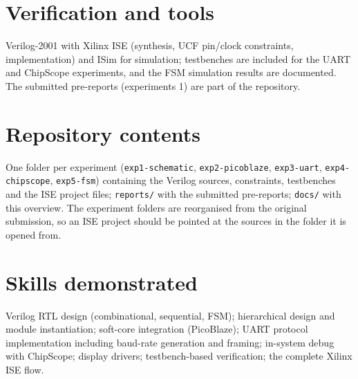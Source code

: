 \documentclass[10pt,a4paper]{article}
\begin{document}
\section*{Verification and tools}
Verilog-2001 with Xilinx ISE (synthesis, UCF pin/clock constraints, implementation) and ISim for simulation;
testbenches are included for the UART and ChipScope experiments, and the FSM simulation results are documented.
The submitted pre-reports (experiments 1) are part of the repository.

\section*{Repository contents}
One folder per experiment (\texttt{exp1-schematic}, \texttt{exp2-picoblaze}, \texttt{exp3-uart},
\texttt{exp4-chipscope}, \texttt{exp5-fsm}) containing the Verilog sources, constraints, testbenches and the ISE
project files; \texttt{reports/} with the submitted pre-reports; \texttt{docs/} with this overview. The experiment
folders are reorganised from the original submission, so an ISE project should be pointed at the sources in the
folder it is opened from.

\section*{Skills demonstrated}
Verilog RTL design (combinational, sequential, FSM); hierarchical design and module instantiation; soft-core
integration (PicoBlaze); UART protocol implementation including baud-rate generation and framing; in-system debug
with ChipScope; display drivers; testbench-based verification; the complete Xilinx ISE flow.
\end{document}

